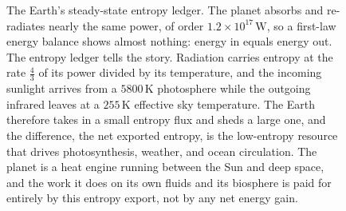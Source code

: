 \begin{figure}[htbp]
\centering
{}
\caption[The planetary entropy budget]{The Earth's steady-state entropy ledger.
The planet absorbs and re-radiates nearly the same power, of order
$1.2\times10^{17}\,\text{W}$, so a first-law energy balance shows almost nothing:
energy in equals energy out. The entropy ledger tells the story. Radiation
carries entropy at the rate $\tfrac43$ of its power divided by its temperature,
and the incoming sunlight arrives from a $5800\,\si{\kelvin}$ photosphere while
the outgoing infrared leaves at a $255\,\si{\kelvin}$ effective sky temperature.
The Earth therefore takes in a small entropy flux and sheds a large one, and the
difference, the net exported entropy, is the low-entropy resource that drives
photosynthesis, weather, and ocean circulation. The planet is a heat engine
running between the Sun and deep space, and the work it does on its own fluids
and its biosphere is paid for entirely by this entropy export, not by any net
energy gain.}
\label{fig:vol04ch04:earth-entropy-budget}
\end{figure}
